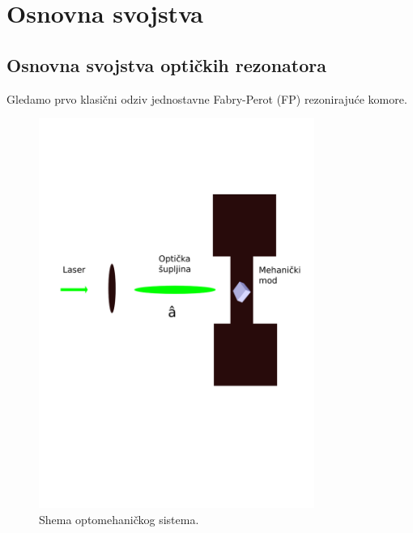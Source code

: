 \section{Osnovna svojstva}
\subsection{Osnovna svojstva optičkih rezonatora}
Gledamo prvo klasični odziv jednostavne Fabry-Perot (FP) rezonirajuće komore.
\begin{figure}[!h]
\begin{center}
	\includegraphics[width=9cm]{../images/F1OptMehShema.png}
\end{center}
\caption{Shema optomehaničkog sistema.}
\label{fig:F1OptMehShema}
\end{figure}

